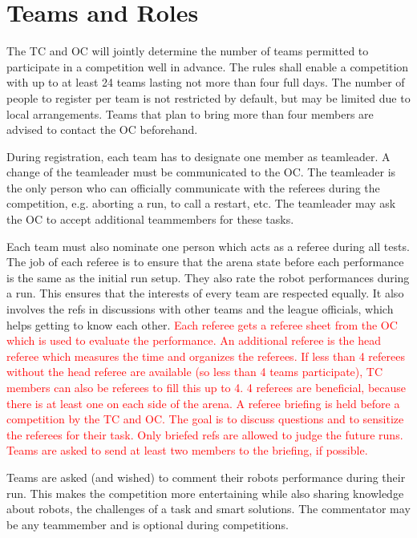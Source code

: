 \label{sec:Competition}

\section{Teams and Roles}

The TC and OC will jointly determine the number of teams permitted to participate in a competition well in advance. The rules shall enable a competition with up to at least 24 teams lasting not more than four full days. The number of people to register per team is not restricted by default, but may be limited due to local arrangements. Teams that plan to bring more than four members are advised to contact the OC beforehand.

During registration, each team has to designate one member as teamleader. A change of the teamleader must be communicated to the OC. 
The teamleader is the only person who can officially communicate with the referees during the competition, e.g. aborting a run, to call a restart, etc. 
The teamleader may ask the OC to accept additional teammembers for these tasks.

Each team must also nominate one person which acts as a referee during all tests.
The job of each referee is to ensure that the arena state before each performance is the same as the initial run setup.
They also rate the robot performances during a run. 
This ensures that the interests of every team are respected equally.
It also involves the refs in discussions with other teams and the league officials,
which helps getting to know each other.
\textcolor{red}{Each referee gets a referee sheet from the OC which is used to evaluate the performance. An additional referee is the head referee which measures the time and organizes the referees. If less than 4 referees without the head referee are available (so less than 4 teams participate), TC members can also be referees to fill this up to 4. 4 referees are beneficial, because there is at least one on each side of the arena. A referee briefing is held before a competition by the TC and OC. The goal is to discuss questions and to sensitize the referees for their task. Only briefed refs are allowed to judge the future runs. Teams are asked to send at least two members to the briefing, if possible.}

Teams are asked (and wished) to comment their robots performance during their run.
This makes the competition more entertaining while also sharing knowledge about robots, 
the challenges of a task and smart solutions.
The commentator may be any teammember and is optional during competitions.

